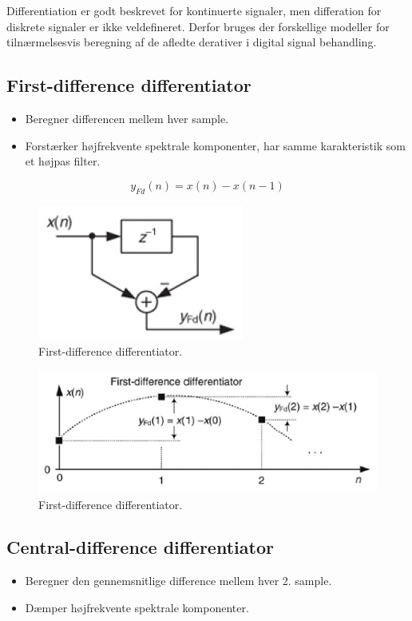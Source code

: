 \documentclass[danish]{article}
\begin{document}
Differentiation er godt beskrevet for kontinuerte signaler, men differation for diskrete signaler er ikke veldefineret. Derfor bruges der forskellige modeller for tilnærmelsesvis beregning af de afledte derativer i digital signal behandling.

\subsection{First-difference differentiator}
\begin{itemize}
	\item Beregner differencen mellem hver sample. 
	\item Forstærker højfrekvente spektrale komponenter, har samme karakteristik som et højpas filter.
\end{itemize}

\begin{equation}
y_{Fd}(n) = x(n)-x(n-1) 
\end{equation}

\begin{figure}[H]
	\centering
	\includegraphics[width=0.3\linewidth]{graphics/first-difference-differentiator}
	\caption{First-difference differentiator.}
	\label{fig:first-difference-differentiator}
\end{figure}

\begin{figure}[H]
	\centering
	\includegraphics[width=0.6\linewidth]{graphics/first-difference-differentiator1}
	\caption{First-difference differentiator.}
	\label{fig:first-difference-differentiator1}
\end{figure}

\subsection{Central-difference differentiator}
\begin{itemize}
	\item Beregner den gennemsnitlige difference mellem hver 2. sample.
	\item Dæmper højfrekvente spektrale komponenter.
\end{itemize}
\end{document}
